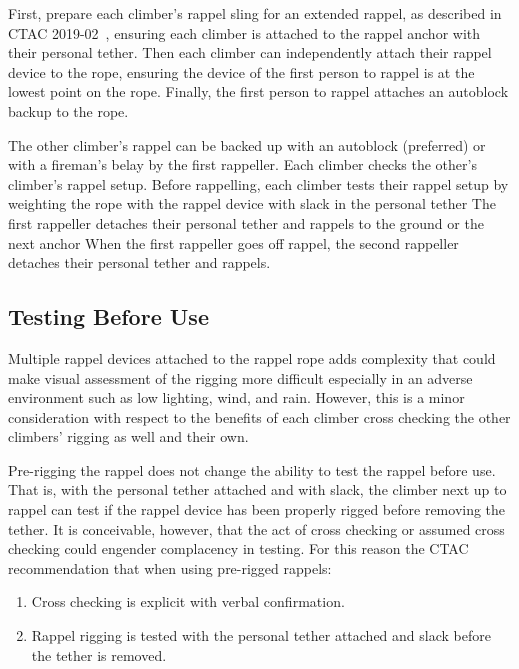 \documentclass[nonacm,acmtog]{acmart}
\begin{document}
  First, prepare each climber's rappel sling for an extended rappel, as
  described in CTAC 2019-02~\cite{ctac:2019-2}, ensuring each climber is
  attached to the rappel anchor with their personal tether.  Then each climber
  can independently attach their rappel device to the rope, ensuring the device
  of the first person to rappel is at the lowest point on the rope.  Finally,
  the first person to rappel attaches an autoblock backup to the rope.

  The other climber's rappel can be backed up with an autoblock (preferred) or
  with a fireman's belay by the first rappeller.  Each climber checks the
  other's climber's rappel setup.  Before rappelling, each climber tests their
  rappel setup by weighting the rope with the rappel device with slack in the
  personal tether The first rappeller detaches their personal tether and
  rappels to the ground or the next anchor When the first rappeller goes off
  rappel, the second rappeller detaches their personal tether and rappels.

\subsection{Testing Before Use}

  Multiple rappel devices attached to the rappel rope adds complexity that
  could make visual assessment of the rigging more difficult especially in an
  adverse environment such as low lighting, wind, and rain.  However, this is a
  minor consideration with respect to the benefits of each climber cross
  checking the other climbers' rigging as well and their own.

  Pre-rigging the rappel does not change the ability to test the rappel before
  use.  That is, with the personal tether attached and with slack, the climber
  next up to rappel can test if the rappel device has been properly rigged
  before removing the tether.  It is conceivable, however, that the act of
  cross checking or assumed cross checking could engender complacency in
  testing.  For this reason the CTAC recommendation that when using pre-rigged
  rappels:

  \begin{enumerate}
  \item Cross checking is explicit with verbal confirmation.
  \item Rappel rigging is tested with the personal tether attached and slack
    before the tether is removed.
  \end{enumerate}
\end{document}
